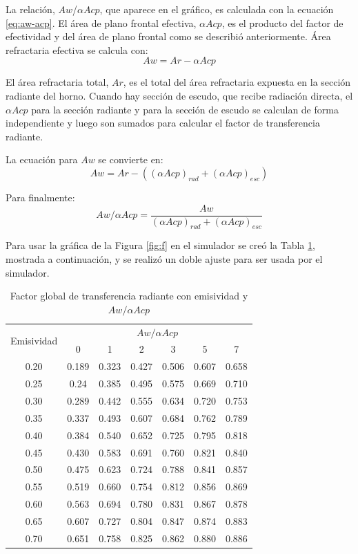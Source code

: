 \par La relación, $Aw$/$\alpha Acp$, que aparece en el gráfico, es calculada con la ecuación \ref{eq:aw-acp}. El área de plano frontal efectiva, $\alpha Acp$, es el producto del factor de efectividad y del área de plano frontal como se describió anteriormente. Área refractaria efectiva se calcula con:
\begin{equation}
Aw = Ar - \alpha Acp
\end{equation}
\par El área refractaria total, $Ar$, es el total del área refractaria expuesta en la sección radiante del horno. Cuando hay sección de escudo, que recibe radiación directa, el $\alpha Acp$ para la sección radiante y para la sección de escudo se calculan de forma independiente y luego son sumados para calcular el factor de transferencia radiante.
\par La ecuación para $Aw$ se convierte en:
\begin{equation}
Aw = Ar - ((\alpha Acp)_{rad} + (\alpha Acp)_{esc})   
\end{equation}
\par Para finalmente:
\begin{equation}
\label{eq:aw-acp}
Aw/\alpha Acp = \frac{Aw}{(\alpha Acp)_{rad} + (\alpha Acp)_{esc}}
\end{equation}

\par Para usar la gráfica de la Figura \ref{fig:f} en el simulador se creó la Tabla \ref{tbl:f-fac}, mostrada a continuación, y se realizó un doble ajuste para ser usada por el simulador.
\begin{table}[H]
\caption{Factor global de transferencia radiante con emisividad y $Aw/\alpha Acp$}
\label{tbl:f-fac}
\centering
\begin{tabular}{c|c|c|c|c|c|c}
\multirow{2}{5em}{Emisividad}&\multicolumn{6}{c}{$Aw/\alpha Acp$}\\
        & 0	    & 1	    & 2	    & 3 	& 5	    & 7     \\
\hline
0.20    & 0.189	& 0.323	& 0.427	& 0.506	& 0.607	& 0.658 \\
0.25    & 0.24	& 0.385	& 0.495	& 0.575	& 0.669	& 0.710 \\
0.30	& 0.289	& 0.442	& 0.555	& 0.634	& 0.720	& 0.753 \\
0.35	& 0.337	& 0.493	& 0.607	& 0.684	& 0.762	& 0.789 \\
0.40	& 0.384	& 0.540	& 0.652	& 0.725	& 0.795	& 0.818 \\
0.45	& 0.430	& 0.583	& 0.691	& 0.760	& 0.821	& 0.840 \\
0.50	& 0.475	& 0.623	& 0.724	& 0.788	& 0.841	& 0.857 \\
0.55	& 0.519	& 0.660	& 0.754	& 0.812	& 0.856	& 0.869 \\
0.60	& 0.563	& 0.694	& 0.780	& 0.831	& 0.867	& 0.878 \\
0.65	& 0.607	& 0.727	& 0.804	& 0.847	& 0.874	& 0.883 \\
0.70	& 0.651	& 0.758	& 0.825	& 0.862	& 0.880	& 0.886 \\
\end{tabular}
\end{table}

